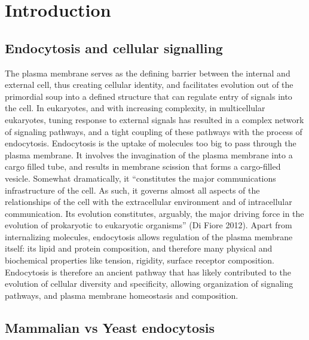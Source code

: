 \chapter{Introduction} %

\label{Ch:Aims} %


\section{Endocytosis and cellular signalling}
The plasma membrane serves as the defining barrier between the internal and external cell, thus creating cellular identity, and facilitates evolution out of the primordial soup into a defined structure that can regulate entry of signals into the cell. In eukaryotes, and with increasing complexity, in multicellular eukaryotes, tuning response to external signals has resulted in a complex network of signaling pathways, and a tight coupling of these pathways with the process of endocytosis. Endocytosis is the uptake of molecules too big to pass through the plasma membrane. It involves the invagination of the plasma membrane into a cargo filled tube, and results in membrane scission that forms a cargo-filled vesicle. Somewhat dramatically, it “constitutes the major communications infrastructure of the cell. As such, it governs almost all aspects of the relationships of the cell with the extracellular environment and of intracellular communication. Its evolution constitutes, arguably, the major driving force in the evolution of prokaryotic to eukaryotic organisms” (Di Fiore 2012).  Apart from internalizing molecules, endocytosis allows regulation of the plasma membrane itself: its lipid and protein composition, and therefore many physical and biochemical properties like tension, rigidity, surface receptor composition. Endocytosis is therefore an ancient pathway that has likely contributed to the evolution of cellular diversity and specificity, allowing organization of signaling pathways, and plasma membrane homeostasis and composition. 



	
	\section{Mammalian vs Yeast endocytosis}
	

